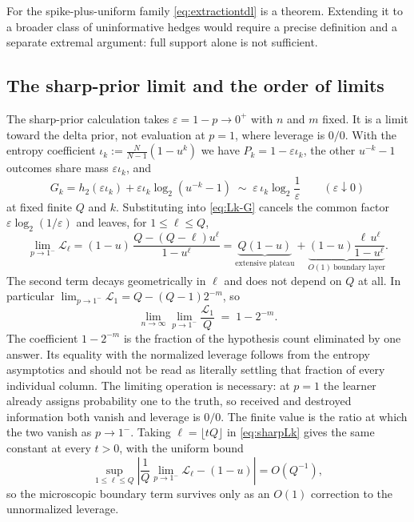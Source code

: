 \documentclass[11pt]{article}
\begin{document}
For the spike-plus-uniform family \eqref{eq:extractiontdl} is a
theorem. Extending it to a broader class of uninformative hedges
would require a precise definition and a separate extremal argument:
full support alone is not sufficient.

\subsection{The sharp-prior limit and the order of limits}

The sharp-prior calculation takes $\varepsilon = 1 - p \to 0^+$ with
$n$ and $m$ fixed. It is a limit toward the delta prior, not
evaluation at $p = 1$, where leverage is $0/0$. With the entropy
coefficient $\iota_k := \tfrac{N}{N-1}(1 - u^k)$ we have
$P_k = 1 - \varepsilon\iota_k$, the other $u^{-k}-1$ outcomes share
mass $\varepsilon\iota_k$, and
%
\begin{equation}
  G_k = h_2(\varepsilon\iota_k)
  + \varepsilon\iota_k\log_2(u^{-k}-1)
  \;\sim\; \varepsilon\,\iota_k\log_2\frac1\varepsilon
  \qquad (\varepsilon \downarrow 0)
  \label{eq:sharpGk}
\end{equation}
%
at fixed finite $Q$ and $k$. Substituting into \eqref{eq:Lk-G}
cancels the common factor $\varepsilon\log_2(1/\varepsilon)$ and
leaves, for $1 \le \ell \le Q$,
%
\begin{equation}
  \lim_{p\to1^-}\mathcal L_\ell
  = (1-u)\,\frac{Q - (Q-\ell)u^\ell}{1-u^\ell}
  = \underbrace{Q(1-u)}_{\text{extensive plateau}}
  + \underbrace{(1-u)\frac{\ell\,u^\ell}{1-u^\ell}}_{O(1)\ \text{boundary layer}} .
  \label{eq:sharpLk}
\end{equation}
%
The second term decays geometrically in $\ell$ and does not depend on
$Q$ at all. In particular
$\lim_{p\to1^-}\mathcal L_1 = Q - (Q-1)2^{-m}$, so
%
\begin{equation}
  \lim_{n\to\infty}\lim_{p\to1^-}\frac{\mathcal L_1}{Q}
  \;=\; 1 - 2^{-m}. 
  \label{eq:culling}
\end{equation}
%
The coefficient $1-2^{-m}$ is the fraction of the hypothesis count
eliminated by one answer. Its equality with the normalized leverage
follows from the entropy asymptotics and should not be read as
literally settling that fraction of every individual column. The
limiting operation is necessary: at $p = 1$ the learner already
assigns probability one to the truth, so received and destroyed
information both vanish and leverage is $0/0$. The finite value is
the ratio at which the two vanish as $p \to 1^-$. Taking
$\ell = \lfloor tQ\rfloor$ in \eqref{eq:sharpLk} gives the same constant
at every $t > 0$, with the uniform bound
%
\begin{equation}
  \sup_{1\le \ell\le Q}
  \left|\frac1Q\lim_{p\to1^-}\mathcal L_\ell - (1-u)\right|
  = O(Q^{-1}),
  \label{eq:plateaubound}
\end{equation}
%
so the microscopic boundary term survives only as an $O(1)$
correction to the unnormalized leverage.
\end{document}
